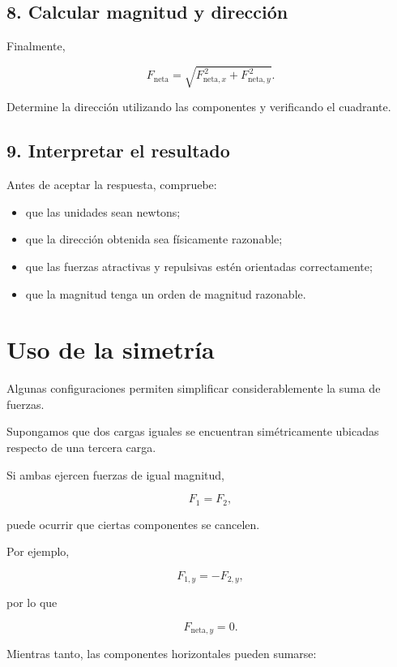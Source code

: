 \subsection{8. Calcular magnitud y dirección}

Finalmente,

\[
F_{\text{neta}}
=
\sqrt{
F_{\text{neta},x}^{\,2}
+
F_{\text{neta},y}^{\,2}
}.
\]

Determine la dirección utilizando las componentes y verificando el cuadrante.

\subsection{9. Interpretar el resultado}

Antes de aceptar la respuesta, compruebe:

\begin{itemize}
    \item que las unidades sean newtons;
    \item que la dirección obtenida sea físicamente razonable;
    \item que las fuerzas atractivas y repulsivas estén orientadas
    correctamente;
    \item que la magnitud tenga un orden de magnitud razonable.
\end{itemize}



\section{Uso de la simetría}

Algunas configuraciones permiten simplificar considerablemente la suma de
fuerzas.

Supongamos que dos cargas iguales se encuentran simétricamente ubicadas
respecto de una tercera carga.

Si ambas ejercen fuerzas de igual magnitud,

\[
F_1=F_2,
\]

puede ocurrir que ciertas componentes se cancelen.

Por ejemplo,

\[
F_{1,y}
=
-F_{2,y},
\]

por lo que

\[
F_{\text{neta},y}=0.
\]

Mientras tanto, las componentes horizontales pueden sumarse:

